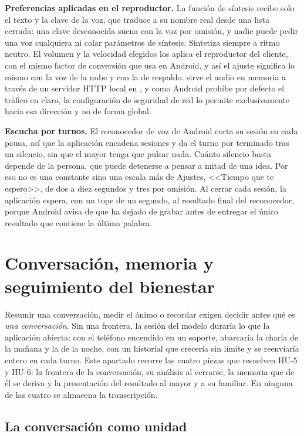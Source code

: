 \textbf{Preferencias aplicadas en el reproductor.} La función de síntesis recibe solo el texto y la clave de la voz, que traduce a su nombre real desde una lista cerrada: una clave desconocida suena con la voz por omisión, y nadie puede pedir una voz cualquiera ni colar parámetros de síntesis. Sintetiza siempre a ritmo neutro. El volumen y la velocidad elegidos los aplica el reproductor del cliente, con el mismo factor de conversión que  usa en Android, y así el ajuste significa lo mismo con la voz de la nube y con la de respaldo.  sirve el audio en memoria a través de un servidor HTTP local en , y como Android prohíbe por defecto el tráfico en claro, la configuración de seguridad de red lo permite exclusivamente hacia esa dirección y no de forma global.

\textbf{Escucha por turnos.} El reconocedor de voz de Android corta su sesión en cada pausa, así que la aplicación encadena sesiones y da el turno por terminado tras un silencio, sin que el mayor tenga que pulsar nada. Cuánto silencio basta depende de la persona, que puede detenerse a pensar a mitad de una idea. Por eso no es una constante sino una escala más de Ajustes, <<Tiempo que te espero>>, de dos a diez segundos y tres por omisión. Al cerrar cada sesión, la aplicación espera, con un tope de un segundo, al resultado final del reconocedor, porque Android avisa de que ha dejado de grabar antes de entregar el único resultado que contiene la última palabra.

\section{Conversación, memoria y seguimiento del bienestar}
\label{sec:conversacion}

Resumir una conversación, medir el ánimo o recordar exigen decidir antes qué es \emph{una conversación}. Sin una frontera, la sesión del modelo duraría lo que la aplicación abierta: con el teléfono encendido en un soporte, abarcaría la charla de la mañana y la de la noche, con un historial que crecería sin límite y se reenviaría entero en cada turno. Este apartado recorre las cuatro piezas que resuelven HU-5 y HU-6: la frontera de la conversación, su análisis al cerrarse, la memoria que de él se deriva y la presentación del resultado al mayor y a su familiar. En ninguna de las cuatro se almacena la transcripción.

\subsection{La conversación como unidad}

